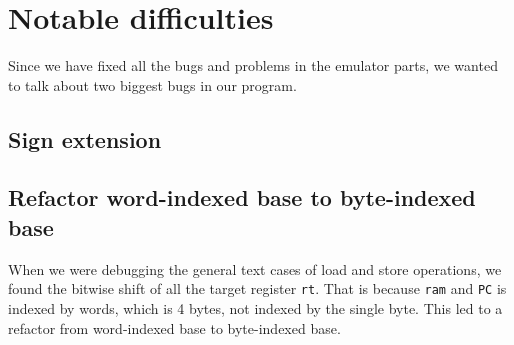 \documentclass[11pt]{article}
\begin{document}
\section{Notable difficulties}
Since we have fixed all the bugs and problems in the emulator parts, we wanted 
to talk about two biggest bugs in our program. 

\subsection{Sign extension}

\subsection{Refactor word-indexed base to byte-indexed base}
When we were debugging the general text cases of load and store operations, 
we found the bitwise shift of all the target register \texttt{rt}.
That is because \texttt{ram} and \texttt{PC} is indexed by words, 
which is 4 bytes, not indexed by the single byte. This led to a  
refactor from word-indexed base to byte-indexed base. 
\end{document}

